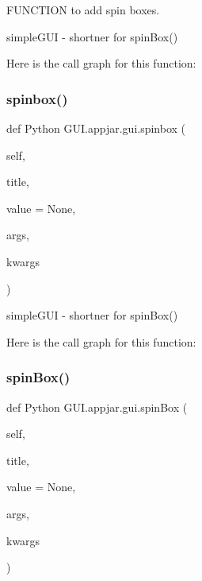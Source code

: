 \begin{DoxyVerb}
F\+U\+N\+C\+T\+I\+ON to add spin boxes. 

\begin{DoxyVerb}simpleGUI - shortner for spinBox() \end{DoxyVerb}
 Here is the call graph for this function\+:
\mbox{\label{class_python_01_g_u_i_1_1appjar_1_1gui_ac0269492710efa645bd3006f9b11db50}} 
\subsubsection{\texorpdfstring{spinbox()}{spinbox()}}
{\footnotesize\ttfamily def Python G\+U\+I.\+appjar.\+gui.\+spinbox (\begin{DoxyParamCaption}\item[{}]{self,  }\item[{}]{title,  }\item[{}]{value = {\ttfamily None},  }\item[{}]{args,  }\item[{}]{kwargs }\end{DoxyParamCaption})}

\begin{DoxyVerb}simpleGUI - shortner for spinBox() \end{DoxyVerb}
 Here is the call graph for this function\+:
\mbox{\label{class_python_01_g_u_i_1_1appjar_1_1gui_aecb4e448fb4eeb8ee81e21e702ce7a24}} 
\subsubsection{\texorpdfstring{spin\+Box()}{spinBox()}}
{\footnotesize\ttfamily def Python G\+U\+I.\+appjar.\+gui.\+spin\+Box (\begin{DoxyParamCaption}\item[{}]{self,  }\item[{}]{title,  }\item[{}]{value = {\ttfamily None},  }\item[{}]{args,  }\item[{}]{kwargs }\end{DoxyParamCaption})}


\end{DoxyVerb}
